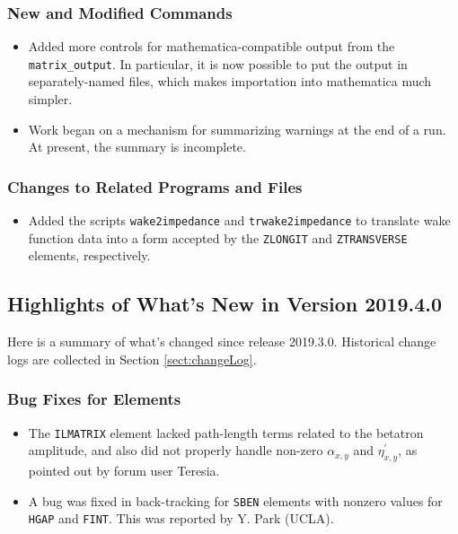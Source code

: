\documentclass[11pt]{article}
\begin{document}
\subsubsection{New and Modified Commands}
\begin{itemize}
\item Added more controls for mathematica-compatible output from the \verb|matrix_output|. In particular, it is now possible to
  put the output in separately-named files, which makes importation into mathematica much simpler.
\item Work began on a mechanism for summarizing warnings at the end of a run. At present, the summary is incomplete.
\end{itemize}

\subsubsection{Changes to Related Programs and Files}

\begin{itemize}
\item Added the scripts \verb|wake2impedance| and \verb|trwake2impedance| to translate wake function data into a
  form accepted by the \verb|ZLONGIT| and \verb|ZTRANSVERSE| elements, respectively.
\end{itemize}

\subsection{Highlights of What's New in Version 2019.4.0}

Here is a summary of what's changed since release 2019.3.0.
Historical change logs are collected in Section \ref{sect:changeLog}.

\subsubsection{Bug Fixes for Elements}

\begin{itemize}
\item The \verb|ILMATRIX| element lacked path-length terms related to the betatron amplitude, and 
  also did not properly handle non-zero $\alpha_{x,y}$ and $\eta_{x,y}^\prime$, as pointed out
  by forum user Teresia.
\item A bug was fixed in back-tracking for \verb|SBEN| elements with nonzero values for \verb|HGAP| and \verb|FINT|.
  This was reported by Y. Park (UCLA).
\end{itemize}
\end{document}
